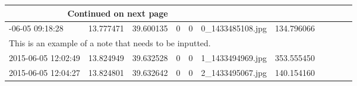 \documentclass[11pt]{article}
\begin{document}
\begin{longtable}{lrrrrlrlrrl}
\toprule
\endhead
\midrule
\multicolumn{3}{r}{{Continued on next page}} \\
\midrule
\endfoot

\bottomrule
\endlastfoot
2015-06-05 09:18:28 &  13.777471 &  39.600135 &  0 &  0 &   0\_1433485108.jpg &  134.796066 &   & {} & {} &   \\
\multicolumn{11}{p{\linewidth}}{This is an example of a note that needs to be inputted.} \\
2015-06-05 12:02:49 &  13.824949 &  39.632528 &  0 &  0 &   1\_1433494969.jpg &  353.555450 &   & {} & {} &   \\
2015-06-05 12:04:27 &  13.824801 &  39.632642 &  0 &  0 &   2\_1433495067.jpg &  140.154160 &   & {} & {} &   \\
\end{longtable}
\end{document}
